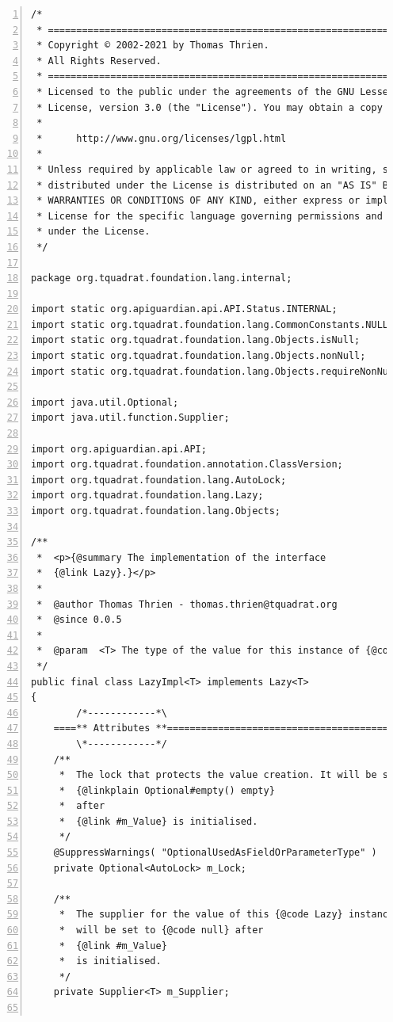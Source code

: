 \documentclass[11pt,a4paper, titlepage, parskip=half, headsepline, footsepline, cleardoublepage=current, headheight=1cm]{scrbook}
\begin{document}
\begin{lstlisting}[numbers=left,caption={LazyImpl.java}]
/*
 * ============================================================================
 * Copyright © 2002-2021 by Thomas Thrien.
 * All Rights Reserved.
 * ============================================================================
 * Licensed to the public under the agreements of the GNU Lesser General Public
 * License, version 3.0 (the "License"). You may obtain a copy of the License at
 *
 *      http://www.gnu.org/licenses/lgpl.html
 *
 * Unless required by applicable law or agreed to in writing, software
 * distributed under the License is distributed on an "AS IS" BASIS, WITHOUT
 * WARRANTIES OR CONDITIONS OF ANY KIND, either express or implied. See the
 * License for the specific language governing permissions and limitations
 * under the License.
 */

package org.tquadrat.foundation.lang.internal;

import static org.apiguardian.api.API.Status.INTERNAL;
import static org.tquadrat.foundation.lang.CommonConstants.NULL_STRING;
import static org.tquadrat.foundation.lang.Objects.isNull;
import static org.tquadrat.foundation.lang.Objects.nonNull;
import static org.tquadrat.foundation.lang.Objects.requireNonNullArgument;

import java.util.Optional;
import java.util.function.Supplier;

import org.apiguardian.api.API;
import org.tquadrat.foundation.annotation.ClassVersion;
import org.tquadrat.foundation.lang.AutoLock;
import org.tquadrat.foundation.lang.Lazy;
import org.tquadrat.foundation.lang.Objects;

/**
 *  <p>{@summary The implementation of the interface
 *  {@link Lazy}.}</p>
 *
 *  @author Thomas Thrien - thomas.thrien@tquadrat.org
 *  @since 0.0.5
 *
 *  @param  <T> The type of the value for this instance of {@code Lazy}.
 */
public final class LazyImpl<T> implements Lazy<T>
{
        /*------------*\
    ====** Attributes **=============================================
        \*------------*/
    /**
     *  The lock that protects the value creation. It will be set to
     *  {@linkplain Optional#empty() empty}
     *  after
     *  {@link #m_Value} is initialised.
     */
    @SuppressWarnings( "OptionalUsedAsFieldOrParameterType" )
    private Optional<AutoLock> m_Lock;

    /**
     *  The supplier for the value of this {@code Lazy} instance. It 
     *  will be set to {@code null} after
     *  {@link #m_Value}
     *  is initialised.
     */
    private Supplier<T> m_Supplier;


\end{lstlisting}
\end{document}
